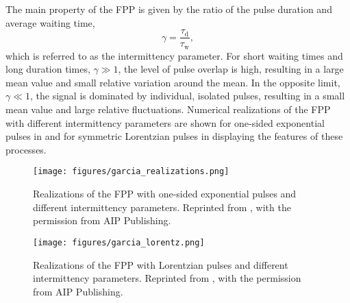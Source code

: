 The main property of the FPP is given by the ratio of the pulse duration and average waiting time, 
\begin{equation}
	\gamma = \frac{\tau_\mathrm{d}}{\tau_\mathrm{w}},
\end{equation}
which is referred to as the intermittency parameter. For short waiting times and long duration times, $\gamma \gg 1$, the level of pulse overlap is high, resulting in a large mean value and small relative variation around the mean. In the opposite limit, $\gamma \ll 1$, the signal is dominated by individual, isolated pulses, resulting in a small mean value and large relative fluctuations. Numerical realizations of the FPP with different intermittency parameters are shown for one-sided exponential pulses in  and for symmetric Lorentzian pulses in  displaying the features of these processes. 
\begin{figure}
	\centering
	\begin{minipage}{.48\linewidth}
		\texttt{[image: figures/garcia\_realizations.png]}
		\caption{Realizations of the FPP with one-sided exponential pulses and different intermittency parameters. Reprinted from \cite{garcia2016stochastic}, with the permission from AIP Publishing.}
		\label{Fig:garcia_realizations}
	\end{minipage}
	\hfill
	\begin{minipage}{.48\linewidth}
		\texttt{[image: figures/garcia\_lorentz.png]}
		\caption{Realizations of the FPP with Lorentzian pulses and different intermittency parameters. Reprinted from \cite{garcia2017power}, with the permission from AIP Publishing.}
		\label{Fig:garcia_realizations_lorentz}
	\end{minipage}
\end{figure}

